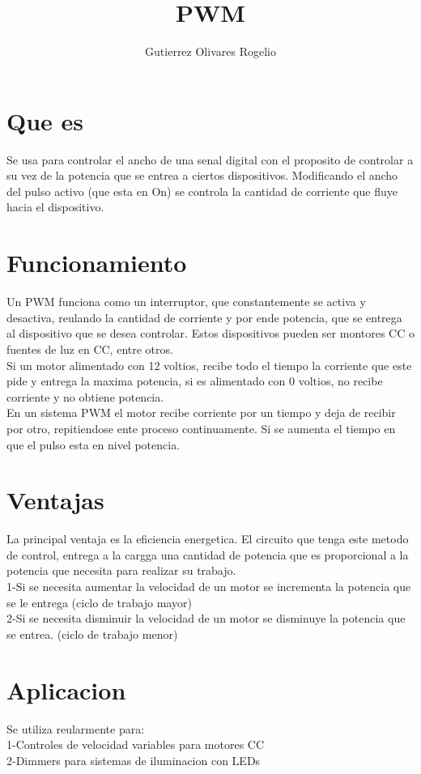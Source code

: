 \documentclass[12pt,a4paper]{report}
\author{Gutierrez Olivares Rogelio}
\title{PWM}
\begin{document}
\maketitle
\section{Que es}
Se usa para controlar el ancho de una senal digital con el proposito de controlar a su vez de  la potencia que se entrea a ciertos dispositivos. Modificando el ancho del pulso activo (que esta en On) se controla la cantidad de corriente que fluye hacia el dispositivo.
\section{Funcionamiento}
Un PWM funciona como un interruptor, que constantemente se activa y desactiva, reulando la cantidad de corriente y por ende potencia, que se entrega al dispositivo que se desea controlar. Estos dispositivos pueden ser montores CC o fuentes de luz en CC, entre otros.\\
Si un motor alimentado con 12 voltios, recibe todo el tiempo la corriente que este pide y entrega la maxima potencia, si es alimentado con 0 voltios, no recibe corriente y no obtiene potencia.\\
En un sistema PWM el motor recibe corriente por un tiempo y deja de recibir por otro, repitiendose ente proceso continuamente. Si se aumenta el tiempo en que el pulso esta en nivel potencia. 
\section{Ventajas}
La principal ventaja es la eficiencia energetica. El circuito que tenga este metodo de control, entrega a la cargga una cantidad de potencia que es proporcional a la potencia que necesita para realizar su trabajo.
\\
1-Si se necesita aumentar la velocidad de un motor se incrementa la potencia que se le entrega (ciclo de trabajo mayor)
\\
2-Si se necesita disminuir la velocidad de un motor se disminuye la potencia que se entrea. (ciclo de trabajo menor)
\section{Aplicacion}
Se utiliza reularmente para:
\\
1-Controles de velocidad variables para motores CC
\\
2-Dimmers para sistemas de iluminacion con LEDs
\end{document}
